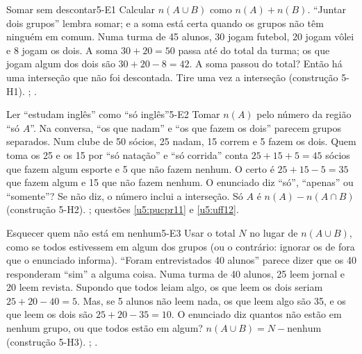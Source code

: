 \ErrosComuns

\begin{erro}{Somar sem descontar}{5-E1}
 Calcular $n(A\cup B)$ como $n(A)+n(B)$.
 \enquote{Juntar dois grupos} lembra somar; e a soma está certa quando os grupos não têm ninguém em comum.
 Numa turma de 45 alunos, 30 jogam futebol, 20 jogam vôlei e 8 jogam os dois. A soma $30+20=50$ passa até do total da turma; os que jogam algum dos dois são $30+20-8=42$.
 A soma passou do total? Então há uma interseção que não foi descontada.
 Tire uma vez a interseção (construção 5-H1).
 ; .
\end{erro}

\begin{erro}{Ler \enquote{estudam inglês} como \enquote{só inglês}}{5-E2}
 Tomar $n(A)$ pelo número da região \enquote{só $A$}.
 Na conversa, \enquote{os que nadam} e \enquote{os que fazem os dois} parecem grupos separados.
 Num clube de 50 sócios, 25 nadam, 15 correm e 5 fazem os dois. Quem toma os 25 e os 15 por \enquote{só natação} e \enquote{só corrida} conta $25+15+5=45$ sócios que fazem algum esporte e 5 que não fazem nenhum. O certo é $25+15-5=35$ que fazem algum e 15 que não fazem nenhum.
 O enunciado diz \enquote{só}, \enquote{apenas} ou \enquote{somente}? Se não diz, o número inclui a interseção.
 Só $A$ é $n(A)-n(A\cap B)$ (construção 5-H2).
 ; questões \ref{u5:pucpr11} e \ref{u5:uff12}.
\end{erro}

\begin{erro}{Esquecer quem não está em nenhum}{5-E3}
 Usar o total $N$ no lugar de $n(A\cup B)$, como se todos estivessem em algum dos grupos (ou o contrário: ignorar os de fora que o enunciado informa).
 \enquote{Foram entrevistados 40 alunos} parece dizer que os 40 responderam \enquote{sim} a alguma coisa.
 Numa turma de 40 alunos, 25 leem jornal e 20 leem revista. Supondo que todos leiam algo, os que leem os dois seriam $25+20-40=5$. Mas, se 5 alunos não leem nada, os que leem algo são 35, e os que leem os dois são $25+20-35=10$.
 O enunciado diz quantos não estão em nenhum grupo, ou que todos estão em algum?
 $n(A\cup B)=N-\text{nenhum}$ (construção 5-H3).
 ; .
\end{erro}

